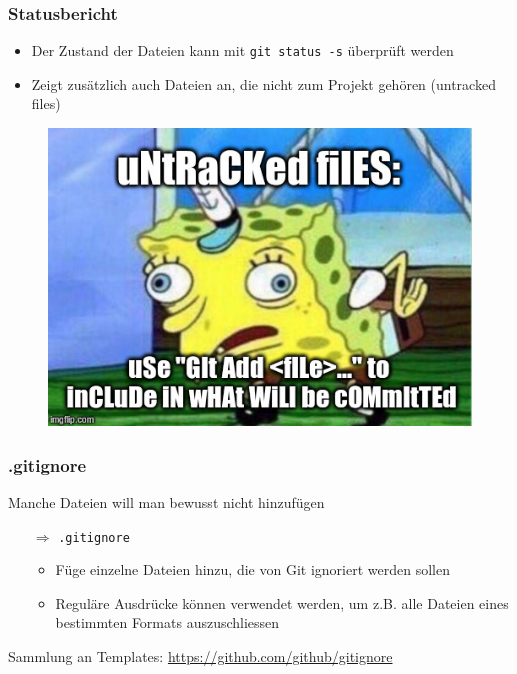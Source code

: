 \documentclass[12pt,utf8]{beamer}
\begin{document}
	\begin{frame}
	\frametitle{Statusbericht}
		\begin{itemize}
			\item Der Zustand der Dateien kann mit \texttt{git status -s} überprüft werden\\
			\item Zeigt zusätzlich auch Dateien an, die nicht zum Projekt gehören (untracked files)
		\end{itemize}
	\end{frame}

	\begin{frame}
		\begin{figure}
			\includegraphics[scale=0.6]{resources/sponge.jpg}
			
			\tiny{\cite{sponge}}
		\end{figure}
	\end{frame}
	
	\begin{frame}
		\frametitle{.gitignore}
		Manche Dateien will man bewusst nicht hinzufügen
		\begin{itemize}
			\item[$\Rightarrow$] \texttt{.gitignore}
			\begin{itemize}
				\item Füge einzelne Dateien hinzu, die von Git ignoriert werden sollen
				\item Reguläre Ausdrücke können verwendet werden, um z.B. alle Dateien eines bestimmten Formats auszuschliessen
			\end{itemize}
		\end{itemize}
		Sammlung an Templates: \url{https://github.com/github/gitignore}
	\end{frame}
\end{document}
